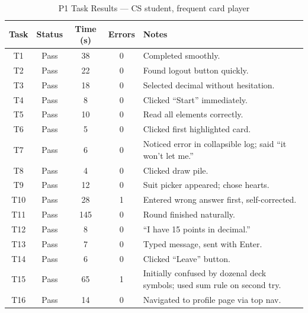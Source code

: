 \documentclass[12pt, titlepage]{article}
\begin{document}
\begin{table}[H]
\centering
\caption{P1 Task Results --- CS student, frequent card player}
\label{tab:p1-raw}
\begin{tabular}{c c c c l}
\toprule
\textbf{Task} & \textbf{Status} & \textbf{Time (s)} & \textbf{Errors} & \textbf{Notes} \\
\midrule
T1  & Pass   & 38  & 0 & Completed smoothly. \\
T2  & Pass   & 22  & 0 & Found logout button quickly. \\
T3  & Pass   & 18  & 0 & Selected decimal without hesitation. \\
T4  & Pass   & 8   & 0 & Clicked ``Start'' immediately. \\
T5  & Pass   & 10  & 0 & Read all elements correctly. \\
T6  & Pass   & 5   & 0 & Clicked first highlighted card. \\
T7  & Pass   & 6   & 0 & Noticed error in collapsible log; said ``it won't let me.'' \\
T8  & Pass   & 4   & 0 & Clicked draw pile. \\
T9  & Pass   & 12  & 0 & Suit picker appeared; chose hearts. \\
T10 & Pass   & 28  & 1 & Entered wrong answer first, self-corrected. \\
T11 & Pass   & 145 & 0 & Round finished naturally. \\
T12 & Pass   & 8   & 0 & ``I have 15 points in decimal.'' \\
T13 & Pass   & 7   & 0 & Typed message, sent with Enter. \\
T14 & Pass   & 6   & 0 & Clicked ``Leave'' button. \\
T15 & Pass   & 65  & 1 & Initially confused by dozenal deck symbols; used sum rule on second try. \\
T16 & Pass   & 14  & 0 & Navigated to profile page via top nav. \\
\bottomrule
\end{tabular}
\end{table}
\end{document}
